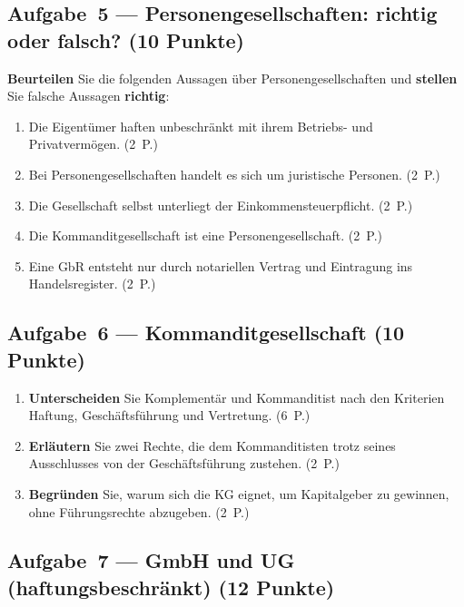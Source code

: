 \documentclass[11pt, a4paper]{article}
\begin{document}
\subsection*{Aufgabe~5 --- Personengesellschaften: richtig oder falsch? (10 Punkte)}

\textbf{Beurteilen} Sie die folgenden Aussagen über Personengesellschaften und
\textbf{stellen} Sie falsche Aussagen \textbf{richtig}:

\begin{enumerate}[label=(\alph*)]
  \item Die Eigentümer haften unbeschränkt mit ihrem Betriebs- und Privatvermögen. \hfill (2~P.)
  \item Bei Personengesellschaften handelt es sich um juristische Personen. \hfill (2~P.)
  \item Die Gesellschaft selbst unterliegt der Einkommensteuerpflicht. \hfill (2~P.)
  \item Die Kommanditgesellschaft ist eine Personengesellschaft. \hfill (2~P.)
  \item Eine GbR entsteht nur durch notariellen Vertrag und Eintragung ins
    Handelsregister. \hfill (2~P.)
\end{enumerate}

\subsection*{Aufgabe~6 --- Kommanditgesellschaft (10 Punkte)}

\begin{enumerate}[label=(\alph*)]
  \item \textbf{Unterscheiden} Sie Komplementär und Kommanditist nach den Kriterien
    Haftung, Geschäftsführung und Vertretung. \hfill (6~P.)
  \item \textbf{Erläutern} Sie zwei Rechte, die dem Kommanditisten trotz seines
    Ausschlusses von der Geschäftsführung zustehen. \hfill (2~P.)
  \item \textbf{Begründen} Sie, warum sich die KG eignet, um Kapitalgeber zu gewinnen,
    ohne Führungsrechte abzugeben. \hfill (2~P.)
\end{enumerate}

\subsection*{Aufgabe~7 --- GmbH und UG (haftungsbeschränkt) (12 Punkte)}
\end{document}
